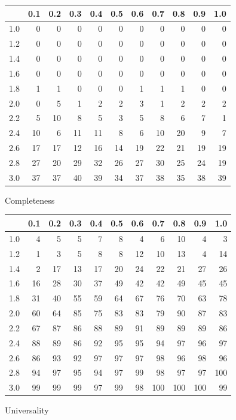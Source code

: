 \renewcommand{\tabcolsep}{0.1cm}
\begin{figure}
  \centering
  \hfil
  \begin{subtable}[t]{0.45\textwidth}
  \begin{tabular}{r|rrrrrrrrrr}
  & 0.1 & 0.2 & 0.3 & 0.4 & 0.5 & 0.6 & 0.7 & 0.8 & 0.9 & 1.0 \\ 
  \hline
  1.0 & 0 & 0 & 0 & 0 & 0 & 0 & 0 & 0 & 0 & 0 \\ 
  1.2 & 0 & 0 & 0 & 0 & 0 & 0 & 0 & 0 & 0 & 0 \\ 
  1.4 & 0 & 0 & 0 & 0 & 0 & 0 & 0 & 0 & 0 & 0 \\ 
  1.6 & 0 & 0 & 0 & 0 & 0 & 0 & 0 & 0 & 0 & 0 \\ 
  1.8 & 1 & 1 & 0 & 0 & 0 & 1 & 1 & 1 & 0 & 0 \\ 
  2.0 & 0 & 5 & 1 & 2 & 2 & 3 & 1 & 2 & 2 & 2 \\ 
  2.2 & 5 & 10 & 8 & 5 & 3 & 5 & 8 & 6 & 7 & 1 \\ 
  2.4 & 10 & 6 & 11 & 11 & 8 & 6 & 10 & 20 & 9 & 7 \\ 
  2.6 & 17 & 17 & 12 & 16 & 14 & 19 & 22 & 21 & 19 & 19 \\ 
  2.8 & 27 & 20 & 29 & 32 & 26 & 27 & 30 & 25 & 24 & 19 \\ 
  3.0 & 37 & 37 & 40 & 39 & 34 & 37 & 38 & 35 & 38 & 39 \\ 
  \end{tabular}
  \caption{Completeness}
  \end{subtable}
  \hfill
  \begin{subtable}[t]{0.45\textwidth}
  \begin{tabular}{r|rrrrrrrrrr}
   & 0.1 & 0.2 & 0.3 & 0.4 & 0.5 & 0.6 & 0.7 & 0.8 & 0.9 & 1.0 \\ 
  \hline
  1.0 & 4 & 5 & 5 & 7 & 8 & 4 & 6 & 10 & 4 & 3 \\ 
  1.2 & 1 & 3 & 5 & 8 & 8 & 12 & 10 & 13 & 4 & 14 \\ 
  1.4 & 2 & 17 & 13 & 17 & 20 & 24 & 22 & 21 & 27 & 26 \\ 
  1.6 & 16 & 28 & 30 & 37 & 49 & 42 & 42 & 49 & 45 & 45 \\ 
  1.8 & 31 & 40 & 55 & 59 & 64 & 67 & 76 & 70 & 63 & 78 \\ 
  2.0 & 60 & 64 & 85 & 75 & 83 & 83 & 79 & 90 & 87 & 83 \\ 
  2.2 & 67 & 87 & 86 & 88 & 89 & 91 & 89 & 89 & 89 & 86 \\ 
  2.4 & 88 & 89 & 86 & 92 & 95 & 95 & 94 & 97 & 96 & 97 \\ 
  2.6 & 86 & 93 & 92 & 97 & 97 & 97 & 98 & 96 & 98 & 96 \\ 
  2.8 & 94 & 97 & 95 & 94 & 97 & 99 & 98 & 97 & 97 & 100 \\ 
  3.0 & 99 & 99 & 99 & 97 & 99 & 98 & 100 & 100 & 100 & 99 \\ 
  \end{tabular}
  \caption{Universality}
  \end{subtable}
  \hfil


\end{figure}
